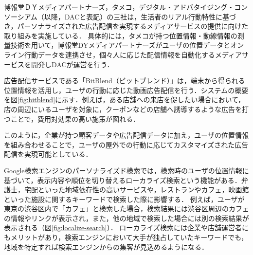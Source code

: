 \documentclass[a4paper]{jsarticle}
\begin{document}
博報堂ＤＹメディアパートナーズ，タメコ，デジタル・アドバタイジング・コンソーシアム（以降，DACと表記）の三社は，生活者のリアル行動特性に基づき，パーソナライズされた広告配信を実現するメディアサービスの提供に向けた取り組みを実施している\cite{tameco}．
具体的には，タメコが持つ位置情報・動線情報の測量技術を用いて，博報堂DYメディアパートナーズがユーザの位置データとオンライン行動データを連携させ，個々人に応じた配信情報を自動化するメディアサービスを開発しDACが運営を行う．

広告配信サービスである「BitBlend（ビットブレンド）\cite{bitblend}」は，端末から得られる位置情報を活用し，ユーザの行動に応じた動画広告配信を行う．システムの概要を図\ref{fig:bitblend}に示す．例えば，ある店舗への来店を促したい場合において，店の周辺にいるユーザを対象に，クーポンなどの店舗へ誘導するような広告を打つことで，費用対効果の高い施策が図れる．

このように，企業が持つ顧客データや広告配信データに加え，ユーザの位置情報を組み合わせることで，ユーザの屋外での行動に応じてカスタマイズされた広告配信を実現可能としている．



Google検索エンジンのパーソナライズド検索では，検索時のユーザの位置情報に基づいて，表示内容や順位を切り替えるローカライズ検索という機能がある．弁護士，宅配といった地域依存性の高いサービスや，レストランやカフェ，映画館といった施設に関するキーワードで検索した際に影響する．
例えば，ユーザが東京の渋谷区内で「カフェ」と検索した場合，検索結果には渋谷区周辺のカフェの情報やリンクが表示され，また，他の地域で検索した場合には別の検索結果が表示される（図\ref{fig:localize-search}）．
ローカライズ検索には企業や店舗運営者にもメリットがあり，検索エンジンにおいて大手が独占していたキーワードでも，地域を特定すれば検索エンジンからの集客が見込めるようになる．
\end{document}

